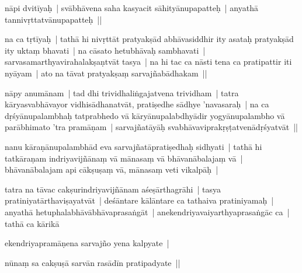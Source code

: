 \documentclass[article,12pt,a4paper]{memoir}%
\newcounter{parCount}
\begin{document}
	  \pstart \leavevmode%
	\label{thakur75-7.9}nāpi dvitīyaḥ | svābhāvena saha kasyacit sāhityānupapatteḥ | anyathā tannivṛttatvānupapatteḥ || 
	{}
	\pend%
      

	  \pstart \leavevmode%
	\label{thakur75-7.11}na ca tṛtīyaḥ | tathā hi nivṛttāt pratyakṣād abhāvasiddhir ity asataḥ pratyakṣād ity uktaṃ bhavati | na cāsato hetubhāvaḥ sambhavati | sarvasamarthyavirahalakṣaṇtvāt tasya | na hi tac ca nāsti tena ca pratipattir iti nyāyam | ato na tāvat pratyakṣaṃ sarvajñabādhakam || 
	{}
	\pend%
      

	  \pstart \leavevmode%
	\label{thakur75-7.15}nāpy anumānam | tad dhi trividhaliṅgajatvena trividham | tatra kāryasvabhāvayor vidhisādhanatvāt, pratiṣedhe sādhye 'navasaraḥ | na ca dṛśyānupalambhaḥ tatprabhedo vā kāryānupalabdhyādir yogyānupalambho vā parābhimato 'tra pramāṇam | sarvajñatāyāḥ svabhāvaviprakṛṣṭatvenādṛśyatvāt || 
	{}
	\pend%
      

	  \pstart \leavevmode%
	\label{thakur75-7.19}nanu kāraṇānupalambhād eva sarvajñatāpratiṣedhaḥ sidhyati | tathā hi tatkāraṇam indriyavijñānaṃ vā mānasaṃ vā bhāvanābalajaṃ vā | bhāvanābalajam api cākṣuṣaṃ vā, mānasaṃ veti vikalpāḥ | 
	{}
	\pend%
      

	  \pstart \leavevmode%
	\label{thakur75-7.22}tatra na tāvac cakṣurindriyavijñānam aśeṣārthagrāhi | tasya pratiniyatārthaviṣayatvāt | deśāntare kālāntare ca tathaiva pratiniyamaḥ | anyathā hetuphalabhāvābhāvaprasaṅgāt | anekendriyavaiyarthyaprasaṅgāc ca | tathā ca kārikā 
	{}
	\pend%
      

	  \pstart \leavevmode%
	ekendriyapramāṇena sarvajño yena kalpyate | 
	{}
	\pend%
      

	  \pstart \leavevmode%
	nūnaṃ sa cakṣuṣā sarvān rasādīn pratipadyate || 
	{}
	\pend%
      
\end{document}
